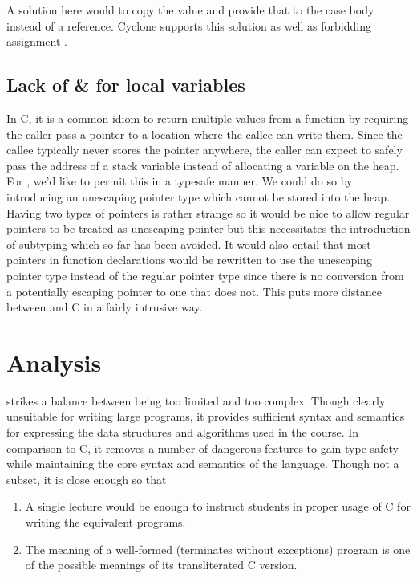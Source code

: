 A solution here would to copy the value and provide that to the case body
instead of a reference. Cyclone supports this solution as well as forbidding
assignment \cite{CycloneUnions}.

\subsection{Lack of \& for local variables} \label{noaddressof}

In C, it is a common idiom to return multiple values from a function by
requiring the caller pass a pointer to a location where the callee can write
them. Since the callee typically never stores the pointer anywhere, the caller
can expect to safely pass the address of a stack variable instead of allocating
a variable on the heap. For \langname{}, we'd like to permit this in a typesafe
manner. We could do so by introducing an unescaping pointer type which cannot
be stored into the heap. Having two types of pointers is rather strange so it
would be nice to allow regular pointers to be treated as unescaping pointer but
this necessitates the introduction of subtyping which so far has been avoided.
It would also entail that most pointers in function declarations would be
rewritten to use the unescaping pointer type instead of the regular pointer type
since there is no conversion from a potentially escaping pointer to one that
does not. This puts more distance between \langname{} and C in a fairly
intrusive way.

\section{Analysis}

\langname{} strikes a balance between being too limited and too complex. Though
clearly unsuitable for writing large programs, it provides sufficient syntax and
semantics for expressing the data structures and algorithms used in the course.
In comparison to C, it removes a number of dangerous features to gain type
safety while maintaining the core syntax and semantics of the language. Though
not a subset, it is close enough so that

\begin{enumerate}

\item A single lecture would be enough to instruct students in proper usage of
C for writing the equivalent programs.

\item The meaning of a well-formed (terminates without exceptions) \langname{}
program is one of the possible meanings of its transliterated C version.

\end{enumerate}
